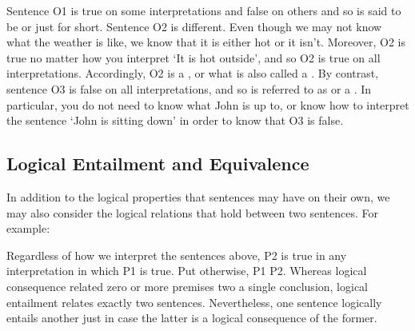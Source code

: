 \begin{earg}
\end{earg}

Sentence O1 is true on some interpretations and false on others and so is said to be  or just  for short.
Sentence O2 is different.
Even though we may not know what the weather is like, we know that it is either hot or it isn't.
Moreover, O2 is true no matter how you interpret `It is hot outside', and so O2 is true on all interpretations.
Accordingly, O2 is a , or what is also called a .
By contrast, sentence O3 is false on all interpretations, and so is referred to as  or a .
In particular, you do not need to know what John is up to, or know how to interpret the sentence `John is sitting down' in order to know that O3 is false.



\subsection{Logical Entailment and Equivalence}

In addition to the logical properties that sentences may have on their own, we may also consider the logical relations that hold between two sentences.
For example:

\begin{earg}
\end{earg}

Regardless of how we interpret the sentences above, P2 is true in any interpretation in which P1 is true.
Put otherwise, P1  P2.
Whereas logical consequence related zero or more premises two a single conclusion, logical entailment relates exactly two sentences.
Nevertheless, one sentence logically entails another just in case the latter is a logical consequence of the former.

